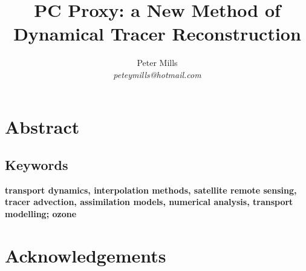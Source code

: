 \documentclass{article}
\begin{document}
\newcommand{\vect}[1]{\ensuremath{\vec #1}}
\newcommand{\italics}[1]{{\it #1}}

\title{PC Proxy: a New Method of Dynamical Tracer Reconstruction}

\author{Peter Mills\\\textit{peteymills@hotmail.com}}

\maketitle

\pagestyle{myheadings}

\section*{Abstract}



\subsection*{Keywords}
\textbf{transport dynamics, interpolation methods, satellite remote sensing, tracer advection, assimilation models, numerical analysis, transport modelling; ozone}

\tableofcontents



\section{Acknowledgements}






\appendix


\end{document}
